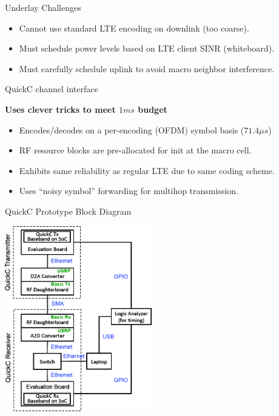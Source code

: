 \documentclass[xcolor=pdftex,dvipsnames,table]{beamer}
\begin{document}
\begin{frame}{Underlay Challenges}
  \begin{itemize}
  \item Cannot use standard LTE encoding on downlink (too coarse).
  \item Must schedule power levels based on LTE client SINR (whiteboard).
  \item Must carefully schedule uplink to avoid macro neighbor interference.
  \end{itemize}
\end{frame}

\begin{frame}{QuickC channel interface}
  \centerline{\alert{\bf Uses clever tricks to meet $1ms$ budget}}
  \vspace{2mm}
  \begin{itemize}
  \item Encodes/decodes on a per-encoding (OFDM) symbol basis ($71.4{\mu}s$)
  \item RF resource blocks are pre-allocated for init at the macro cell.
  \item Exhibits same reliability as regular LTE due to same coding scheme.
  \item Uses ``noisy symbol'' forwarding for multihop transmission.
  \end{itemize}
\end{frame}

\begin{frame}{QuickC Prototype Block Diagram}
  \centerline{\includegraphics[width=0.48\textwidth]{./figs/quickc-prototype.png}}
\end{frame}
\end{document}
